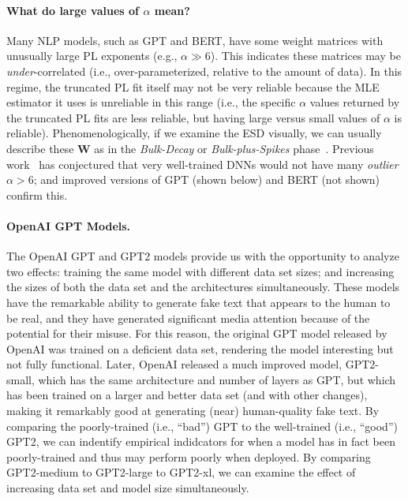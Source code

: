 \paragraph{What do large values of $\alpha$ mean?}

Many NLP models, such as GPT and BERT, have some weight matrices with unusually large PL exponents (e.g., $\alpha\gg 6$).
This indicates these matrices may be \emph{under}-correlated (i.e., over-parameterized, relative to the amount of data).
In this regime, the truncated PL fit itself may not be very reliable because the MLE estimator it uses is unreliable in this range (i.e., the specific $\alpha$ values returned by the truncated PL fits are less reliable, but having large versus small values of $\alpha$ is reliable).
Phenomenologically, if we examine the ESD visually, we can usually describe these $\mathbf{W}$ as in the \emph{Bulk-Decay} or \emph{Bulk-plus-Spikes} phase~\cite{MM18_TR,MM19_HTSR_ICML}.
Previous work~\cite{MM18_TR,MM19_HTSR_ICML} has conjectured that very well-trained DNNs would not have many \emph{outlier} $\alpha>6$; and improved versions of GPT (shown below) and BERT (not shown) confirm this.


\paragraph{OpenAI GPT Models.}

The OpenAI GPT and GPT2 models provide us with the opportunity to analyze two effects: training the same model with different data set sizes; and increasing the sizes of both the data set and the architectures simultaneously.
These models have the remarkable ability to generate fake text that appears to the human to be real, and they have generated significant media attention because of the potential for their misuse.
For this reason, the original GPT model released by OpenAI was trained on a deficient data set, rendering the model interesting but not fully functional.  
Later, OpenAI released a much improved model, GPT2-small, which has the same architecture and number of layers as GPT, but which has been trained on a larger and better data set (and with other changes), making it remarkably good at generating (near) human-quality fake text.  
%
By comparing the poorly-trained (i.e., ``bad'') GPT to the well-trained (i.e., ``good'') GPT2, we can indentify empirical indidcators for when a model has in fact been poorly-trained and thus may perform poorly when deployed.
By comparing GPT2-medium to GPT2-large to GPT2-xl, we can examine the effect of increasing data set and model size simultaneously.


